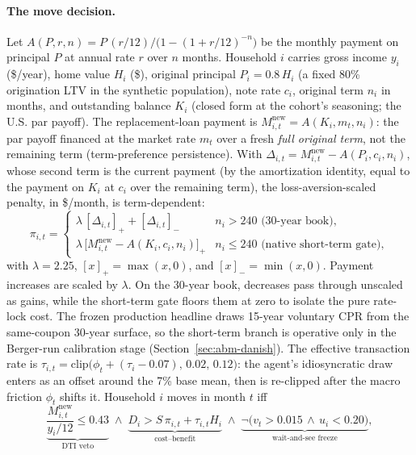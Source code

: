 \documentclass[12pt]{article}
\begin{document}
\paragraph{The move decision.}
Let $A(P,r,n) = P\,(r/12)\big/\big(1-(1+r/12)^{-n}\big)$ be the monthly payment on principal $P$ at annual rate $r$ over $n$ months. %
Household $i$ carries gross income $y_i$ (\$/year), home value $H_i$ (\$), original principal $P_i = 0.8\,H_i$ (a fixed 80\% origination LTV in the synthetic population), note rate $c_i$, original term $n_i$ in months, and outstanding balance $K_i$ (closed form at the cohort's seasoning; the U.S. par payoff). %
The replacement-loan payment is $M^{\mathrm{new}}_{i,t} = A(K_i, m_t, n_i)$: the par payoff financed at the market rate $m_t$ over a fresh \emph{full original term}, not the remaining term (term-preference persistence). %
With $\Delta_{i,t} = M^{\mathrm{new}}_{i,t} - A(P_i, c_i, n_i)$, whose second term is the current payment (by the amortization identity, equal to the payment on $K_i$ at $c_i$ over the remaining term), the loss-aversion-scaled penalty, in \$/month, is term-dependent:
\begin{equation}\label{eq:abmpenalty}
\pi_{i,t} =
\begin{cases}
\lambda\,[\Delta_{i,t}]_{+} + [\Delta_{i,t}]_{-} & n_i > 240 \text{ (30-year book)},\\
\lambda\,\big[M^{\mathrm{new}}_{i,t} - A(K_i, c_i, n_i)\big]_{+} & n_i \le 240 \text{ (native short-term gate)},
\end{cases}
\end{equation}
with $\lambda = 2.25$, $[x]_{+} = \max(x,0)$, and $[x]_{-} = \min(x,0)$. Payment increases are scaled by $\lambda$. On the 30-year book, decreases pass through unscaled as gains, while the short-term gate floors them at zero to isolate the pure rate-lock cost. The frozen production headline draws 15-year voluntary CPR from the same-coupon 30-year surface, so the short-term branch is operative only in the Berger-run calibration stage (Section~\ref{sec:abm-danish}).
The effective transaction rate is $\tau_{i,t} = \mathrm{clip}\big(\phi_t + (\tau_i - 0.07),\,0.02,\,0.12\big)$: the agent's idiosyncratic draw enters as an offset around the 7\% base mean, then is re-clipped after the macro friction $\phi_t$ shifts it. %
Household $i$ moves in month $t$ iff
\begin{equation}\label{eq:abmmove}
\underbrace{\frac{M^{\mathrm{new}}_{i,t}}{y_i/12} \le 0.43}_{\text{DTI veto}}
\;\wedge\;
\underbrace{D_i > S\,\pi_{i,t} + \tau_{i,t} H_i}_{\text{cost--benefit}}
\;\wedge\;
\underbrace{\neg\big(v_t > 0.015 \,\wedge\, u_i < 0.20\big)}_{\text{wait-and-see freeze}},
\end{equation}
\end{document}
